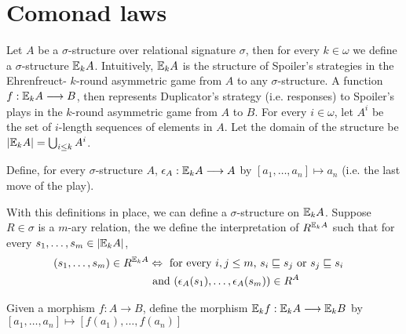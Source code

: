 \section{Comonad laws}
Let $A$ be a $\sigma$-structure over relational signature $\sigma$, then for every $k \in \omega$ we define a $\sigma$-structure ${\mathbb{E}_{k}A}$. Intuitively, ${\mathbb{E}_{k}A}$ is the structure of Spoiler's strategies in the Ehrenfreuct-{\Fraisse} $k$-round asymmetric game from $A$ to any $\sigma$-structure. A function $f:{\mathbb{E}_{k}A} \longrightarrow B$, then represents Duplicator's strategy (i.e. responses) to Spoiler's plays in the $k$-round asymmetric game from $A$ to $B$. For every $i \in \omega$, let $A^{i}$ be the set of $i$-length sequences of elements in $A$. Let the domain of the structure be $|{\mathbb{E}_{k}A}| = \bigcup_{i \leq k} A^{i}$. 
\begin{defn}
Define, for every $\sigma$-structure $A$, $\epsilon_{A}:{\mathbb{E}_{k}A} \longrightarrow A$ by $[a_{1},\dots,a_{n}] \mapsto a_{n}$ (i.e. the last move of the play). 
\label{defn:epsilonEF}
\end{defn}
With this definitions in place, we can define a $\sigma$-structure on ${\mathbb{E}_{k}A}$. Suppose $R \in \sigma$ is a $m$-ary relation, the we define the interpretation of $R^{{\mathbb{E}_{k}A}}$ such that for every $s_{1},\dots,s_{m} \in |{\mathbb{E}_{k}A}|$,
\begin{align}
(s_{1},\dots,s_{m}) \in R^{{\mathbb{E}_{k}A}} &\Leftrightarrow \text{ for every $i,j \leq m$, } s_{i} \sqsubseteq s_{j} \text{ or } s_{j} \sqsubseteq s_{i} & \label{eq:R1st} \\ 
&\text{ and } (\epsilon_{A}(s_{1}),\dots,\epsilon_{A}(s_{m})) \in R^{A} & \label{eq:R2nd}
\end{align}
\begin{defn}
Given a morphism $f:A \longrightarrow B$, define the morphism ${\mathbb{E}_{k}f}:{\mathbb{E}_{k}A} \longrightarrow {\mathbb{E}_{k}B}$ by $[a_{1},\dots,a_{n}] \mapsto [f(a_{1}),\dots,f(a_{n})]$
\label{defn:comonadMorphismEF}
\end{defn}
